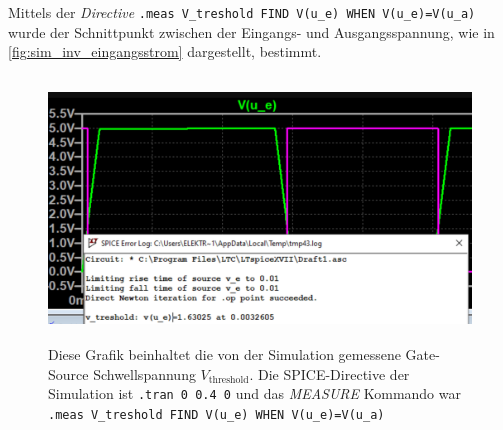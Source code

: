 \documentclass[12pt,english,ngerman]{scrartcl}
\begin{document}
Mittels der \textit{Directive} \texttt{.meas V\_treshold FIND V(u\_e) WHEN V(u\_e)=V(u\_a)} wurde der
Schnittpunkt zwischen der Eingangs- und Ausgangsspannung, wie in 
\autoref{fig:sim_inv_eingangsstrom} dargestellt, bestimmt.

\begin{figure}[H]
  \centering
    \includegraphics[width=\linewidth, height=7cm]{./simdaten_lab/cmos/inverter/treshold.png}
    \caption{Diese Grafik beinhaltet die von der Simulation gemessene
    Gate-Source Schwellspannung $V_{\mathrm{threshold}}$. Die SPICE-Directive
    der Simulation ist \texttt{.tran 0 0.4 0} und das \textit{MEASURE} Kommando
    war \texttt{.meas V\_treshold FIND V(u\_e) WHEN V(u\_e)=V(u\_a)}}
  \label{fig:sim_inv_threshold}
\end{figure}
\end{document}
